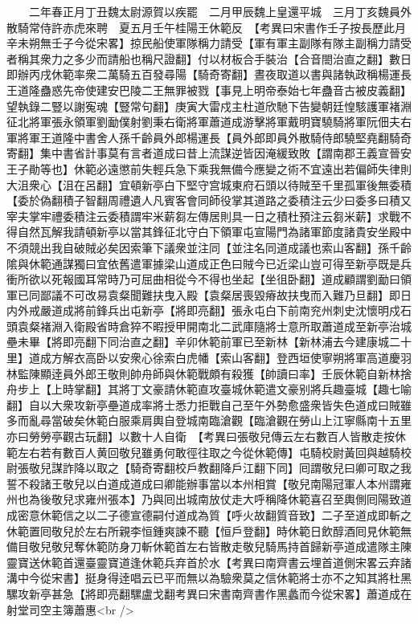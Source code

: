 　　二年春正月丁丑魏太尉源賀以疾罷　二月甲辰魏上皇還平城　三月丁亥魏員外散騎常侍許赤虎來聘　夏五月壬午桂陽王休範反　【考異曰宋書作壬子按長歷此月辛未朔無壬子今從宋畧】掠民船使軍隊稱力請受【軍有軍主副隊有隊主副稱力請受者稱其衆力之多少而請船也稱尺證翻】付以材板合手裝治【合音閤治直之翻】數日即辦丙戌休範率衆二萬騎五百發尋陽【騎奇寄翻】晝夜取道以書與諸執政稱楊運長王道隆蠱惑先帝使建安巴陵二王無罪被戮【事見上明帝泰始七年蠱音古被皮義翻】望執錄二豎以謝寃魂【豎常句翻】庚寅大雷戍主杜道欣馳下告變朝廷惶駭護軍褚淵征北將軍張永領軍劉勔僕射劉秉右衛將軍蕭道成游擊將軍戴明寶驍騎將軍阮佃夫右軍將軍王道隆中書舍人孫千齡員外郎楊運長【員外郎即員外散騎侍郎驍堅堯翻騎奇寄翻】集中書省計事莫有言者道成曰昔上流謀逆皆因淹緩致敗【謂南郡王義宣晉安王子勛等也】休範必遠懲前失輕兵急下乘我無備今應變之術不宜遠出若偏師失律則大沮衆心【沮在呂翻】宜頓新亭白下堅守宫城東府石頭以待賊至千里孤軍後無委積【委於偽翻積子智翻周禮遺人凡賓客會同師役掌其道路之委積注云少曰委多曰積又宰夫掌牢禮委積注云委積謂牢米薪芻左傳居則具一日之積杜預注云芻米薪】求戰不得自然瓦解我請頓新亭以當其鋒征北守白下領軍屯宣陽門為諸軍節度諸貴安坐殿中不須競出我自破賊必矣因索筆下議衆並注同【並注名同道成議也索山客翻】孫千齡隂與休範通謀獨曰宜依舊遣軍據梁山道成正色曰賊今已近梁山豈可得至新亭既是兵衝所欲以死報國耳常時乃可屈曲相從今不得也坐起【坐徂卧翻】道成顧謂劉勔曰領軍已同鄙議不可改易袁粲聞難扶曳入殿【袁粲居喪毀瘠故扶曳而入難乃旦翻】即日内外戒嚴道成將前鋒兵出屯新亭【將即亮翻】張永屯白下前南兖州刺史沈懷明戍石頭袁粲褚淵入衛殿省時倉猝不暇授甲開南北二武庫隨將士意所取蕭道成至新亭治城壘未畢【將即亮翻下同治直之翻】辛卯休範前軍已至新林【新林浦去今建康城二十里】道成方解衣高卧以安衆心徐索白虎幡【索山客翻】登西垣使寧朔將軍高道慶羽林監陳顯逹員外郎王敬則帥舟師與休範戰頗有殺獲【帥讀曰率】壬辰休範自新林捨舟步上【上時掌翻】其將丁文豪請休範直攻臺城休範遣文豪别將兵趣臺城【趣七喻翻】自以大衆攻新亭壘道成率將士悉力拒戰自己至午外勢愈盛衆皆失色道成曰賊雖多而亂尋當破矣休範白服乘肩輿自登城南臨滄觀【臨滄觀在勞山上江寧縣南十五里亦曰勞勞亭觀古玩翻】以數十人自衛　【考異曰張敬兒傳云左右數百人皆散走按休範左右若有數百人黄回敬兒雖勇何敢徑往取之今從休範傳】屯騎校尉黃回與越騎校尉張敬兒謀詐降以取之【騎奇寄翻校戶教翻降戶江翻下同】囘謂敬兒曰卿可取之我誓不殺諸王敬兒以白道成道成曰卿能辦事當以本州相賞【敬兒南陽冠軍人本州謂雍州也為後敬兒求雍州張本】乃與囘出城南放仗走大呼稱降休範喜召至輿側囘陽致道成密意休範信之以二子德宣德嗣付道成為質【呼火故翻質音致】二子至道成即斬之休範置囘敬兒於左右所親李恒鍾爽諫不聽【恒戶登翻】時休範日飲醇酒囘見休範無備目敬兒敬兒奪休範防身刀斬休範首左右皆散走敬兒騎馬持首歸新亭道成遣隊主陳靈寶送休範首還臺靈寶道逢休範兵弃首於水【考異曰南齊書云埋首道側宋畧云弃諸溝中今從宋書】挺身得逹唱云已平而無以為驗衆莫之信休範將士亦不之知其將杜黑騾攻新亭甚急【將即亮翻騾盧戈翻考異曰宋書南齊書作黑蠡而今從宋畧】蕭道成在射堂司空主簿蕭惠<br />
